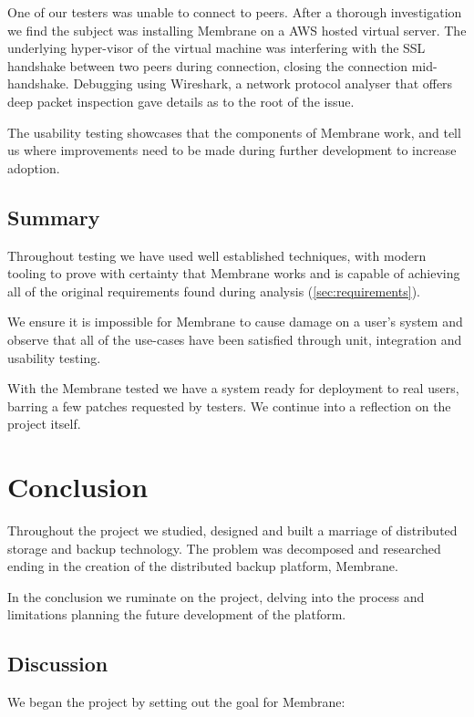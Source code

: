 \documentclass[11pt, a4paper, twocolumn, twoside]{report}
\begin{document}
One of our testers was unable to connect to peers. After a thorough investigation we find the subject was installing Membrane on a AWS hosted virtual server. The underlying hyper-visor of the virtual machine was interfering with the SSL handshake between two peers during connection, closing the connection mid-handshake. Debugging using Wireshark, a network protocol analyser that offers deep packet inspection gave details as to the root of the issue.

The usability testing showcases that the components of Membrane work, and tell us where improvements need to be made during further development to increase adoption.

\section{Summary}

Throughout testing we have used well established techniques, with modern tooling to prove with certainty that Membrane works and is capable of achieving all of the original requirements found during analysis (\ref{sec:requirements}).

We ensure it is impossible for Membrane to cause damage on a user's system and observe that all of the use-cases have been satisfied through unit, integration and usability testing.

With the Membrane tested we have a system ready for deployment to real users, barring a few patches requested by testers. We continue into a reflection on the project itself.

\chapter{Conclusion}

Throughout the project we studied, designed and built a marriage of distributed storage and backup technology. The problem was decomposed and researched ending in the creation of the distributed backup platform, Membrane.

In the conclusion we ruminate on the project, delving into the process and limitations planning the future development of the platform.

\section{Discussion}

We began the project by setting out the goal for Membrane:
\end{document}
